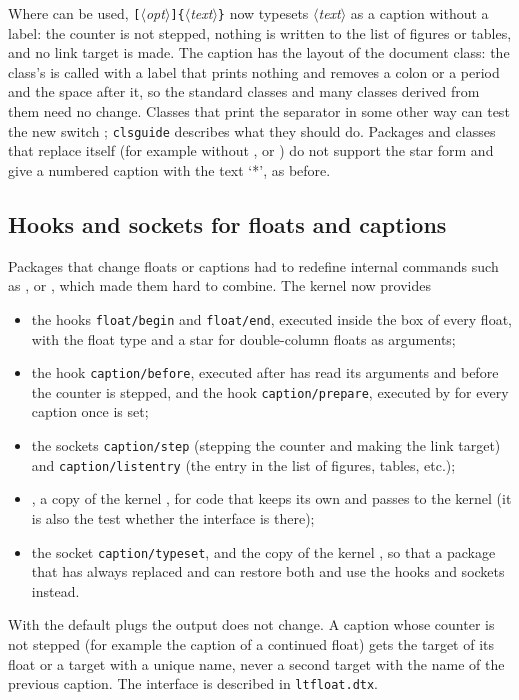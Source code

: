 \documentclass{ltnews}
\providecommand\hook[1]{\texttt{#1}}
\providecommand\meta[1]{$\langle$\textrm{\itshape#1}$\rangle$}
\providecommand\Arg[1]{\texttt\{\meta{#1}\texttt\}}
\let\cls\pkg
\begin{document}
Where  can be used, \texttt{[}\meta{opt}\texttt{]}\Arg{text} now
typesets \meta{text} as a caption without a label: the counter is not
stepped, nothing is written to the list of figures or tables, and no link
target is made. The caption has the layout of the document class: the
class's  is called with a label that prints nothing and
removes a colon or a period and the space after it, so the standard
classes and many classes derived from them need no change. Classes that
print the separator in some other way can test the new switch
; \texttt{clsguide} describes what they should do.
Packages and classes that replace  itself (for example
 without , or \cls{beamer}) do not
support the star form and give a numbered caption with the text `*', as
before.


\subsection{Hooks and sockets for floats and captions}

Packages that change floats or captions had to redefine internal
commands such as ,  or , which made
them hard to combine. The kernel now provides
\begin{itemize}
\item the hooks \hook{float/begin} and \hook{float/end}, executed inside
  the box of every float, with the float type and a star for
  double-column floats as arguments;
\item the hook \hook{caption/before}, executed after  has
  read its arguments and before the counter is stepped, and the hook
  \hook{caption/prepare}, executed by  for every caption
  once  is set;
\item the sockets \texttt{caption/step} (stepping the counter and making
  the link target) and \texttt{caption/listentry} (the entry in the list
  of figures, tables, etc.);
\item {}, a copy of the kernel , for code
  that keeps its own  and passes  to the
  kernel (it is also the test whether the interface is there);
\item the socket \texttt{caption/typeset}, and the copy
   of the kernel , so that a package
  that has always replaced  and  can restore
  both and use the hooks and sockets instead.
\end{itemize}
With the default plugs the output does not change. A caption whose
counter is not stepped (for example the caption of a continued float)
gets the target of its float or a target with a unique name, never a
second target with the name of the previous caption. The interface is
described in \texttt{ltfloat.dtx}.
\end{document}
